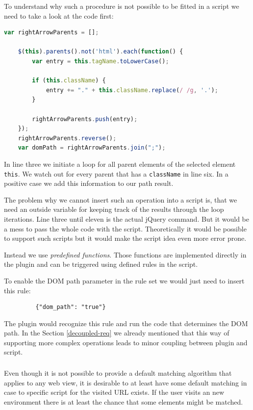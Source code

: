 To understand why such a procedure is not possible to be fitted in a script we need to take a look at the code first:

\begin{lstlisting}[language=JavaScript]
    var rightArrowParents = [];

    $(this).parents().not('html').each(function() {
        var entry = this.tagName.toLowerCase();

        if (this.className) {
            entry += "." + this.className.replace(/ /g, '.');
        }

        rightArrowParents.push(entry);
    });
    rightArrowParents.reverse();    
    var domPath = rightArrowParents.join(";");
\end{lstlisting}

In line three we initiate a loop for all parent elements of the selected element \verb^this^. We watch out for every parent that has a \verb^className^ in line six. In a positive case we add this information to our path result. 

The problem why we cannot insert such an operation into a script is, that we need an outside variable for keeping track of the results through the loop iterations. Line three until eleven is the actual jQuery command. But it would be a mess to pass the whole code with the script. Theoretically it would be possible to support such scripts but it would make the script idea even more error prone. 

Instead we use \emph{predefined functions}. Those functions are implemented directly in the plugin and can be triggered using defined rules in the script. 

To enable the DOM path parameter in the rule set we would just need to insert this rule:
\begin{lstlisting}
         {"dom_path": "true"}
\end{lstlisting}
The plugin would recognize this rule and run the code that determines the DOM path. In the Section \ref{decoupled-req} we already mentioned that this way of supporting more complex operations leads to minor coupling between plugin and script. 

\subsubsection[Default Matching Procedure]{\reqSv}\label{reqSv}

Even though it is not possible to provide a default matching algorithm that applies to any web view, it is desirable to at least have some default matching in case to specific script for the visited URL exists. If the user visits an new environment there is at least the chance that some elements might be matched.

